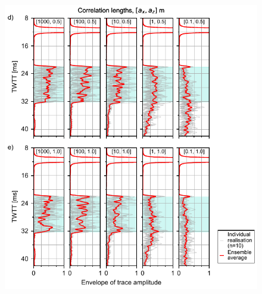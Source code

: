 \documentclass[se,manuscript]{copernicus}
\begin{document}
\setcounter{figure}{3}

\begin{figure}
    \includegraphics{figures/si_fig03_pg_2.pdf}
    \caption{}
    \label{fig:single-source-2}
\end{figure}

\clearpage
\end{document}
